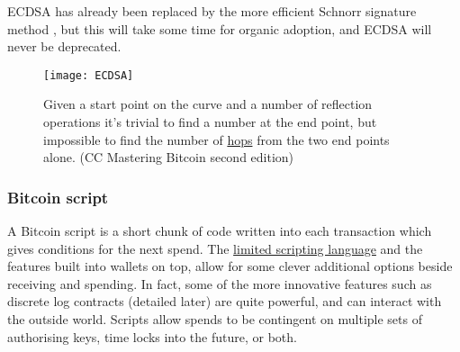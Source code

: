 ECDSA has already been replaced by the more efficient Schnorr signature method \cite{schnorr1989efficient}, but this will take some time for organic adoption, and ECDSA will never be deprecated.\par
\begin{figure}
  \centering
    \texttt{[image: ECDSA]}
  \caption{Given a start point on the curve and a number of reflection operations it's trivial to find a number at the end point, but impossible to find the number of \href{https://github.com/bitcoinbook/bitcoinbook/blob/develop/ch04.asciidoc}{hops} from the two end points alone. (CC Mastering Bitcoin second edition)}
  \label{fig:ECDSA}
\end{figure}
\subsubsection{Bitcoin script}
A Bitcoin script is a short chunk of code written into each transaction which gives conditions for the next spend. The \href{https://bitcoin.sipa.be/miniscript/}{limited scripting language} and the features built into wallets on top, allow for some clever additional options beside receiving and spending. In fact, some of the more innovative features such as discrete log contracts (detailed later) are quite powerful, and can interact with the outside world. Scripts allow spends to be contingent on multiple sets of authorising keys, time locks into the future, or both.\par
